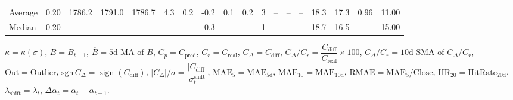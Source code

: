 \begin{threeparttable}
{\begin{tabular}{lrrrrrrrrrrrrrrrrr}
Average &     0.20 & 1786.2 & 1791.0 & 1786.7 &        4.3 &            0.2 &                      -0.2 &                      0.1 &                 0.2 &              3 &         -- &        -- &             -- &             18.3 &                17.3 &            0.96 &                  11.00 \\
 Median &     0.20 &     -- &     -- &     -- &         -- &             -- &                      -0.3 &                       -- &                  -- &              1 &         -- &        -- &             -- &             18.7 &                16.5 &              -- &                  15.00 \\
\bottomrule
\end{tabular}
}
\begin{tablenotes}\footnotesize
\item $\kappa=\kappa(\sigma)$, $B=B_{t-1}$, $\overline{B}=\text{5d MA of }B$, $C_p=C_{\text{pred}}$, $C_r=C_{\text{real}}$, $C_\Delta=C_{\text{diff}}$, $C_\Delta/C_r=\dfrac{C_{\text{diff}}}{C_{\text{real}}}\times100$, $\overline{C_\Delta/C_r}=\text{10d SMA of }C_\Delta/C_r$, $\mathrm{Out}=\text{Outlier}$, $\mathrm{sgn}\,C_\Delta=\operatorname{sign}(C_{\text{diff}})$, $|C_\Delta|/\sigma=\dfrac{|C_{\text{diff}}|}{\sigma_t^{\text{shift}}}$, $\mathrm{MAE}_5=\mathrm{MAE}_{5\text{d}}$, $\mathrm{MAE}_{10}=\mathrm{MAE}_{10\text{d}}$, $\mathrm{RMAE}= \mathrm{MAE}_5 / \text{Close}$, $\mathrm{HR}_{20}=\mathrm{HitRate}_{20\text{d}}$, $\lambda_{\text{shift}}=\lambda_t$, $\Delta\alpha_t=\alpha_t-\alpha_{t-1}$.
\end{tablenotes}
\end{threeparttable}
\endgroup

